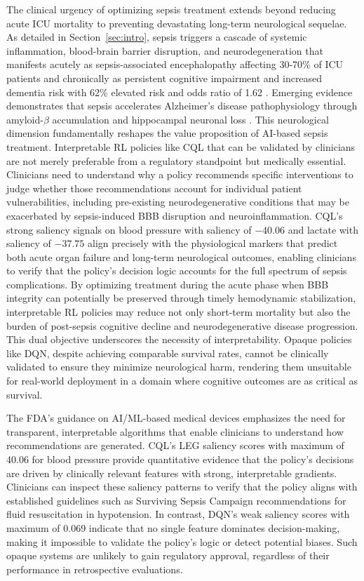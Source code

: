 The clinical urgency of optimizing sepsis treatment extends beyond reducing acute ICU mortality to preventing devastating long-term neurological sequelae. As detailed in Section~\ref{sec:intro}, sepsis triggers a cascade of systemic inflammation, blood-brain barrier disruption, and neurodegeneration that manifests acutely as sepsis-associated encephalopathy affecting 30-70\% of ICU patients and chronically as persistent cognitive impairment and increased dementia risk with 62\% elevated risk and odds ratio of 1.62 \citep{lei2022dementia_risk_sepsis, barichello2020bbb_sepsis, iwashyna2010longterm_cognitive}. Emerging evidence demonstrates that sepsis accelerates Alzheimer's disease pathophysiology through amyloid-$\beta$ accumulation and hippocampal neuronal loss \citep{giridharan2023sepsis_alzheimers}. This neurological dimension fundamentally reshapes the value proposition of AI-based sepsis treatment. Interpretable RL policies like CQL that can be validated by clinicians are not merely preferable from a regulatory standpoint but medically essential. Clinicians need to understand why a policy recommends specific interventions to judge whether those recommendations account for individual patient vulnerabilities, including pre-existing neurodegenerative conditions that may be exacerbated by sepsis-induced BBB disruption and neuroinflammation. CQL's strong saliency signals on blood pressure with saliency of $-40.06$ and lactate with saliency of $-37.75$ align precisely with the physiological markers that predict both acute organ failure and long-term neurological outcomes, enabling clinicians to verify that the policy's decision logic accounts for the full spectrum of sepsis complications. By optimizing treatment during the acute phase when BBB integrity can potentially be preserved through timely hemodynamic stabilization, interpretable RL policies may reduce not only short-term mortality but also the burden of post-sepsis cognitive decline and neurodegenerative disease progression. This dual objective underscores the necessity of interpretability. Opaque policies like DQN, despite achieving comparable survival rates, cannot be clinically validated to ensure they minimize neurological harm, rendering them unsuitable for real-world deployment in a domain where cognitive outcomes are as critical as survival.

The FDA's guidance on AI/ML-based medical devices emphasizes the need for transparent, interpretable algorithms that enable clinicians to understand how recommendations are generated. CQL's LEG saliency scores with maximum of 40.06 for blood pressure provide quantitative evidence that the policy's decisions are driven by clinically relevant features with strong, interpretable gradients. Clinicians can inspect these saliency patterns to verify that the policy aligns with established guidelines such as Surviving Sepsis Campaign recommendations for fluid resuscitation in hypotension. In contrast, DQN's weak saliency scores with maximum of 0.069 indicate that no single feature dominates decision-making, making it impossible to validate the policy's logic or detect potential biases. Such opaque systems are unlikely to gain regulatory approval, regardless of their performance in retrospective evaluations.

